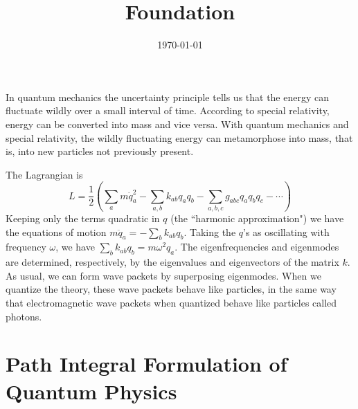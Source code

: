 \documentclass[11pt,a4paper]{article}
\title{Foundation}
\author{}
\date{\today}
\newcounter{theo}[section]\setcounter{theo}{0}
\begin{document}
\maketitle

In quantum mechanics the uncertainty principle tells us that the energy can fluctuate wildly over a small interval of time. According to special relativity, energy can be converted into mass and vice versa. With quantum mechanics and special relativity, the wildly fluctuating energy can metamorphose into mass, that is, into new particles not previously present.




The Lagrangian is
\begin{equation}
L = \dfrac{1}{2} (\sum_a m \dot{q}_a^2 - \sum_{a, b} k_{ab} q_a q_b - \sum_{a, b, c} g_{abc} q_a q_b q_c - \cdots) 
\end{equation}
Keeping only the terms quadratic in $q$ (the ``harmonic approximation") we have the equations of motion $m \ddot{q}_a = -\sum_b k_{ab} q_b$. Taking the $q$'s as oscillating with frequency $\omega$, we have $\sum_b k_{ab} q_b = m\omega^2 q_a$. The eigenfrequencies and eigenmodes are determined, respectively, by the eigenvalues and eigenvectors of the matrix $k$. As usual, we can form wave packets by superposing eigenmodes. When we quantize the theory, these wave packets behave like particles, in the same way that electromagnetic wave packets when quantized behave like particles called photons.




\section{Path Integral Formulation of Quantum Physics}
\end{document}
